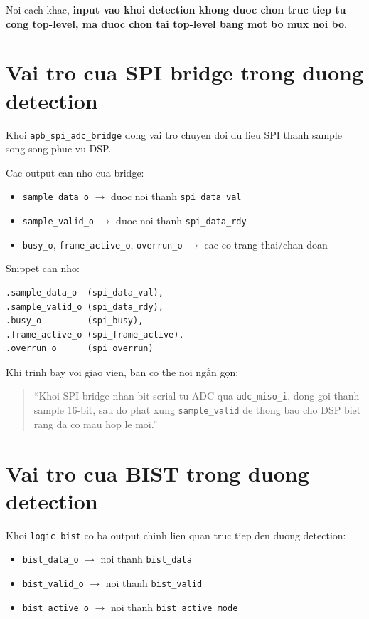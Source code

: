 \documentclass[12pt,a4paper]{article}
\begin{document}
Noi cach khac, \textbf{input vao khoi detection khong duoc chon truc tiep tu cong top-level, ma duoc chon tai top-level bang mot bo mux noi bo}.

\section{Vai tro cua SPI bridge trong duong detection}
Khoi \texttt{apb\_spi\_adc\_bridge} dong vai tro chuyen doi du lieu SPI thanh sample song song phuc vu DSP.

Cac output can nho cua bridge:
\begin{itemize}
    \item \texttt{sample\_data\_o} $\rightarrow$ duoc noi thanh \texttt{spi\_data\_val}
    \item \texttt{sample\_valid\_o} $\rightarrow$ duoc noi thanh \texttt{spi\_data\_rdy}
    \item \texttt{busy\_o}, \texttt{frame\_active\_o}, \texttt{overrun\_o} $\rightarrow$ cac co trang thai/chan doan
\end{itemize}

Snippet can nho:
\begin{lstlisting}[style=svstyle]
.sample_data_o  (spi_data_val),
.sample_valid_o (spi_data_rdy),
.busy_o         (spi_busy),
.frame_active_o (spi_frame_active),
.overrun_o      (spi_overrun)
\end{lstlisting}

Khi trinh bay voi giao vien, ban co the noi ngắn gọn:
\begin{quote}
``Khoi SPI bridge nhan bit serial tu ADC qua \texttt{adc\_miso\_i}, dong goi thanh sample 16-bit, sau do phat xung \texttt{sample\_valid} de thong bao cho DSP biet rang da co mau hop le moi.''
\end{quote}

\section{Vai tro cua BIST trong duong detection}
Khoi \texttt{logic\_bist} co ba output chinh lien quan truc tiep den duong detection:
\begin{itemize}
    \item \texttt{bist\_data\_o} $\rightarrow$ noi thanh \texttt{bist\_data}
    \item \texttt{bist\_valid\_o} $\rightarrow$ noi thanh \texttt{bist\_valid}
    \item \texttt{bist\_active\_o} $\rightarrow$ noi thanh \texttt{bist\_active\_mode}
\end{itemize}
\end{document}
